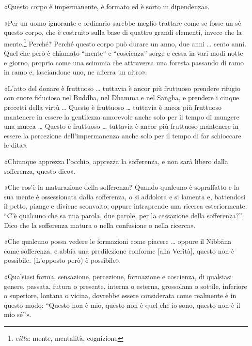 

«Questo corpo è impermanente, è formato ed è sorto in dipendenza».




«Per un uomo ignorante e ordinario sarebbe meglio trattare come se fosse
un sé questo corpo, che è costruito sulla base di quattro grandi
elementi, invece che la mente.\footnote{\emph{citta}: mente, mentalità, cognizione}
Perché? Perché questo
corpo può durare un anno, due anni … cento anni. Quel che però è
chiamato “mente” e “coscienza” sorge e cessa in vari modi notte e
giorno, proprio come una scimmia che attraversa una foresta passando di
ramo in ramo e, lasciandone uno, ne afferra un altro».




«L’atto del donare è fruttuoso … tuttavia è ancor più fruttuoso prendere
rifugio con cuore fiducioso nel Buddha, nel Dhamma e nel Saṅgha, e
prendere i cinque precetti della virtù … Questo è fruttuoso … tuttavia è
ancor più fruttuoso mantenere in essere la gentilezza amorevole anche
solo per il tempo di mungere una mucca … Questo è fruttuoso … tuttavia è
ancor più fruttuoso mantenere in essere la percezione dell’impermanenza
anche solo per il tempo di far schioccare le dita».




«Chiunque apprezza l’occhio, apprezza la sofferenza, e non sarà libero
dalla sofferenza, questo dico».




«Che cos’è la maturazione della sofferenza? Quando qualcuno è
sopraffatto e la sua mente è ossessionata dalla sofferenza, o si
addolora e si lamenta e, battendosi il petto, piange e diviene
sconvolto, oppure intraprende una ricerca esteriormente: “C’è qualcuno
che sa una parola, due parole, per la cessazione della sofferenza?”.
Dico che la sofferenza matura o nella confusione o nella ricerca».




«Che qualcuno possa vedere le formazioni come piacere … oppure il
Nibbāna come sofferenza, e abbia una predilezione conforme [alla
Verità], questo non è possibile. (L’opposto però) è possibile».




«Qualsiasi forma, sensazione, percezione, formazione e coscienza, di
qualsiasi genere, passata, futura o presente, interna o esterna,
grossolana o sottile, inferiore o superiore, lontana o vicina, dovrebbe
essere considerata come realmente è in questo modo: “Questo non è mio,
questo non è quel che io sono, questo non è il mio sé”».


